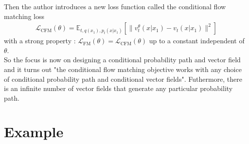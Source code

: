 \documentclass[a4paper,12pt]{article}
\begin{document}
Then the author introduces a new loss function called the conditional flow matching loss
\begin{align}
  \mathcal{L}_\text{CFM}(\theta) = \mathbb{E}_{t,q(x_1),p_t(x|x_1)}\left[\|v_t^\theta(x|x_1)-v_t(x|x_1)\|^2\right]
\end{align}
with a strong property : \(\mathcal{L}_\text{FM}(\theta)=\mathcal{L}_\text{CFM}(\theta)\) up to a constant independent of \(\theta\). \\
So the focus is now on designing a conditional probability path and vector field and it turns out "the conditional flow matching objective works with any choice of conditional probability path and conditional vector fields". Futhermore, there is an infinite number of vector fields that generate any particular probability path.\\

\section{Example}




\end{document}
